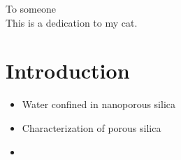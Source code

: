 \documentclass[twoside,english,a4paper]{uiofysmaster}
\begin{document}

\cleardoublepage

\begin{abstract}
\lipsum
\end{abstract}

\begin{dedication}
  To someone
  \\\vspace{12pt}
  This is a dedication to my cat.
\end{dedication}

\begin{acknowledgements}
  \lipsum
\end{acknowledgements}

\tableofcontents

\listoffigures
\listoftables
\listoflistings


\part{Introduction}
\begin{itemize}
    \item Water confined in nanoporous silica
    \item Characterization of porous silica
    \item 
\end{itemize}
\end{document}
